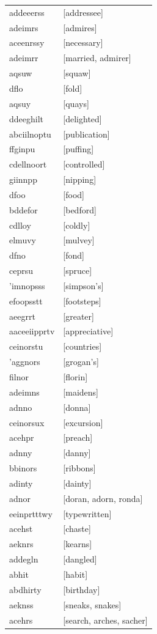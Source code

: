 \documentclass{article}
\begin{document}
\begin{tabular}{ll}
addeeerss & [addressee] \\
adeimrs & [admires] \\
aceenrssy & [necessary] \\
adeimrr & [married, admirer] \\
aqsuw & [squaw] \\
dflo & [fold] \\
aqsuy & [quays] \\
ddeeghilt & [delighted] \\
abciilnoptu & [publication] \\
ffginpu & [puffing] \\
cdellnoort & [controlled] \\
giinnpp & [nipping] \\
dfoo & [food] \\
bddefor & [bedford] \\
cdlloy & [coldly] \\
elmuvy & [mulvey] \\
dfno & [fond] \\
ceprsu & [spruce] \\
'imnopsss & [simpson's] \\
efoopsstt & [footsteps] \\
aeegrrt & [greater] \\
aaceeiipprtv & [appreciative] \\
ceinorstu & [countries] \\
'aggnors & [grogan's] \\
filnor & [florin] \\
adeimns & [maidens] \\
adnno & [donna] \\
ceinorsux & [excursion] \\
acehpr & [preach] \\
adnny & [danny] \\
bbinors & [ribbons] \\
adinty & [dainty] \\
adnor & [doran, adorn, ronda] \\
eeinprtttwy & [typewritten] \\
acehst & [chaste] \\
aeknrs & [kearns] \\
addegln & [dangled] \\
abhit & [habit] \\
abdhirty & [birthday] \\
aeknss & [sneaks, snakes] \\
acehrs & [search, arches, sacher] \\

\end{tabular}
\end{document}
